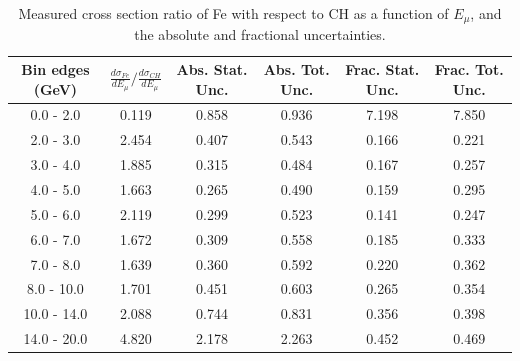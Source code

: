 \documentclass[aps,prl,twocolumn,superscriptaddress,nofootinbib]{revtex4-1}
\begin{document}
\begin{table}[h!]
  \centering
  \caption{Measured cross section ratio of Fe with respect to CH as a function
  of $E_{\mu}$,  and the absolute and fractional uncertainties.}
    \begin{tabular}{c||c||c|c||c|c}
      Bin edges (GeV) & $\frac{d\sigma_{Fe}}{dE_{\mu}}/\frac{d\sigma_{CH}}{dE_{\mu}}$ & Abs. Stat. Unc. & Abs. Tot. Unc. & Frac. Stat. Unc. & Frac. Tot. Unc. \\
      \hline\hline
        0.0 - 2.0 & 0.119 & 0.858 & 0.936 & 7.198 & 7.850 \\
        2.0 - 3.0 & 2.454 & 0.407 & 0.543 & 0.166 & 0.221 \\
        3.0 - 4.0 & 1.885 & 0.315 & 0.484 & 0.167 & 0.257 \\
        4.0 - 5.0 & 1.663 & 0.265 & 0.490 & 0.159 & 0.295 \\
        5.0 - 6.0 & 2.119 & 0.299 & 0.523 & 0.141 & 0.247 \\
        6.0 - 7.0 & 1.672 & 0.309 & 0.558 & 0.185 & 0.333 \\
        7.0 - 8.0 & 1.639 & 0.360 & 0.592 & 0.220 & 0.362 \\
       8.0 - 10.0 & 1.701 & 0.451 & 0.603 & 0.265 & 0.354 \\
      10.0 - 14.0 & 2.088 & 0.744 & 0.831 & 0.356 & 0.398 \\
      14.0 - 20.0 & 4.820 & 2.178 & 2.263 & 0.452 & 0.469 \\
    \end{tabular}
  \label{table:EmuXSecRatio_Fe}
\end{table}
\end{document}
